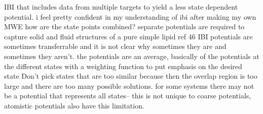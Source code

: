\documentclass{article}
\begin{document}
\cite{Moore2014}
IBI that includes data from multiple targets to yield a less state dependent potential.
i feel pretty confident in my understanding of ibi after making my own MWE
how are the state points combined?
separate potentials are required to capture solid and fluid structures of a pure simple lipid ref 46
IBI potentials are sometimes transferrable and it is not clear why sometimes they are and sometimes they aren't.
the potentials are an average, basically of the potentials at the different states with a weighting function to put emphasis on the desired state
Don't pick states that are too similar because then the overlap region is too large and there are too many possible solutions. for some systems there may not be a potential that represents all states-- this is not unique to coarse potentials, atomistic potentials also have this limitation.



\end{document}
